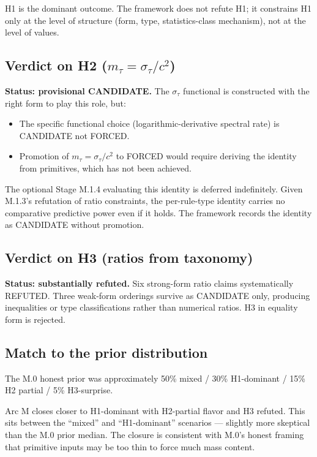 \documentclass[11pt,a4paper]{article}
\begin{document}
H1 is the dominant outcome. The framework does not refute H1; it constrains H1 only at the level of structure (form, type, statistics-class mechanism), not at the level of values.

\subsection{Verdict on H2 ($m_\tau = \sigma_\tau/c^2$)}

\textbf{Status: provisional CANDIDATE.} The $\sigma_\tau$ functional is constructed with the right form to play this role, but:

\begin{itemize}[noitemsep]
  \item The specific functional choice (logarithmic-derivative spectral rate) is CANDIDATE not FORCED.
  \item Promotion of $m_\tau = \sigma_\tau/c^2$ to FORCED would require deriving the identity from primitives, which has not been achieved.
\end{itemize}

The optional Stage M.1.4 evaluating this identity is deferred indefinitely. Given M.1.3's refutation of ratio constraints, the per-rule-type identity carries no comparative predictive power even if it holds. The framework records the identity as CANDIDATE without promotion.

\subsection{Verdict on H3 (ratios from taxonomy)}

\textbf{Status: substantially refuted.} Six strong-form ratio claims systematically REFUTED. Three weak-form orderings survive as CANDIDATE only, producing inequalities or type classifications rather than numerical ratios. H3 in equality form is rejected.

\subsection{Match to the prior distribution}

The M.0 honest prior was approximately 50\% mixed / 30\% H1-dominant / 15\% H2 partial / 5\% H3-surprise.

Arc M closes closer to H1-dominant with H2-partial flavor and H3 refuted. This sits between the ``mixed'' and ``H1-dominant'' scenarios --- slightly more skeptical than the M.0 prior median. The closure is consistent with M.0's honest framing that primitive inputs may be too thin to force much mass content.
\end{document}
